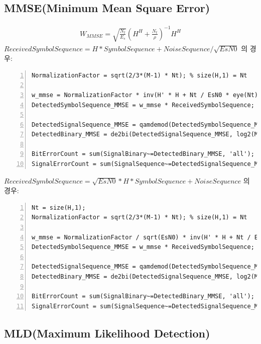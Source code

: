 \documentclass{article}
\begin{document}
\subsection{MMSE(Minimum Mean Square Error)}
\begin{gather}
	W_{MMSE}=\sqrt{\frac{N_t}{E_s}}(H^H+\frac{N_t}{\rho})^{-1}H^H
\end{gather}
$ReceivedSymbolSequence = H * SymbolSequence + NoiseSequence / \sqrt{EsN0}$ 의 경우:
\begin{lstlisting}[style=Matlab-editor, frame=single, numbers=left,]
NormalizationFactor = sqrt(2/3*(M-1) * Nt); % size(H,1) = Nt

w_mmse = NormalizationFactor * inv(H' * H + Nt / EsN0 * eye(Nt)) * H';
DetectedSymbolSequence_MMSE = w_mmse * ReceivedSymbolSequence;

DetectedSignalSequence_MMSE = qamdemod(DetectedSymbolSequence_MMSE, M);
DetectedBinary_MMSE = de2bi(DetectedSignalSequence_MMSE, log2(M), 'left-msb');

BitErrorCount = sum(SignalBinary~=DetectedBinary_MMSE, 'all');
SignalErrorCount = sum(SignalSequence~=DetectedSignalSequence_MMSE, 'all');
\end{lstlisting}
\vspace{0.5cm}
$ReceivedSymbolSequence = \sqrt{EsN0} * H * SymbolSequence + NoiseSequence$ 의 경우:
\begin{lstlisting}[style=Matlab-editor, frame=single, numbers=left,]
Nt = size(H,1);
NormalizationFactor = sqrt(2/3*(M-1) * Nt); % size(H,1) = Nt

w_mmse = NormalizationFactor / sqrt(EsN0) * inv(H' * H + Nt / EsN0 * eye(Nt)) * H';
DetectedSymbolSequence_MMSE = w_mmse * ReceivedSymbolSequence; % Detection (Zero-Forcing: y / h)

DetectedSignalSequence_MMSE = qamdemod(DetectedSymbolSequence_MMSE, M); % Detection
DetectedBinary_MMSE = de2bi(DetectedSignalSequence_MMSE, log2(M), 'left-msb');

BitErrorCount = sum(SignalBinary~=DetectedBinary_MMSE, 'all');
SignalErrorCount = sum(SignalSequence~=DetectedSignalSequence_MMSE, 'all');
\end{lstlisting}
\subsection{MLD(Maximum Likelihood Detection)}
\end{document}
